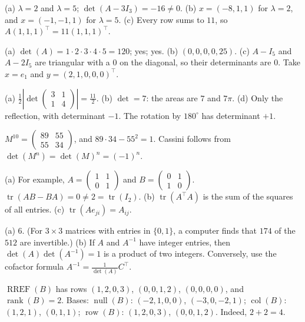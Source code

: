 \documentclass[11pt]{article}
\theoremstyle{definition}
\DeclareMathOperator{\rank}{rank}
\DeclareMathOperator{\Null}{null}
\DeclareMathOperator{\col}{col}
\DeclareMathOperator{\row}{row}
\DeclareMathOperator{\RREF}{RREF}
\DeclareMathOperator{\tr}{tr}
\begin{document}
\begin{description}[leftmargin=0pt, itemsep=0.3em]
    \item[\ref{pr:lambda}.] (a) $\lambda = 2$ and $\lambda = 5$; $\det(A - 3I_3) = -16 \neq 0$. (b) $x = (-8, 1, 1)$ for $\lambda = 2$, and $x = (-1, -1, 1)$ for $\lambda = 5$. (c) Every row sums to $11$, so $A(1, 1, 1)^\top = 11 (1, 1, 1)^\top$.
    \item[\ref{pr:upper5}.] (a) $\det(A) = 1 \cdot 2 \cdot 3 \cdot 4 \cdot 5 = 120$; yes; yes. (b) $(0, 0, 0, 0, 25)$. (c) $A - I_5$ and $A - 2I_5$ are triangular with a $0$ on the diagonal, so their determinants are $0$. Take $x = e_1$ and $y = (2, 1, 0, 0, 0)^\top$.
    \item[\ref{pr:area}.] (a) $\frac{1}{2}\left|\det \begin{pmatrix} 3 & 1 \\ 1 & 4 \end{pmatrix}\right| = \frac{11}{2}$. (b) $\det = 7$: the areas are $7$ and $7\pi$. (d) Only the reflection, with determinant $-1$. The rotation by $180^\circ$ has determinant $+1$.
    \item[\ref{pr:fibonacci}.] $M^{10} = \begin{pmatrix} 89 & 55 \\ 55 & 34 \end{pmatrix}$, and $89 \cdot 34 - 55^2 = 1$. Cassini follows from $\det(M^n) = \det(M)^n = (-1)^n$.
    \item[\ref{pr:trace}.] (a) For example, $A = \begin{pmatrix} 1 & 1 \\ 0 & 1 \end{pmatrix}$ and $B = \begin{pmatrix} 0 & 1 \\ 1 & 0 \end{pmatrix}$. $\tr(AB - BA) = 0 \neq 2 = \tr(I_2)$. (b) $\tr(A^\top A)$ is the sum of the squares of all entries. (c) $\tr(Ae_{ji}) = A_{ij}$.
    \item[\ref{pr:01-matrices}.] (a) $6$. (For $3 \times 3$ matrices with entries in $\{0, 1\}$, a computer finds that $174$ of the $512$ are invertible.) (b) If $A$ and $A^{-1}$ have integer entries, then $\det(A)\det(A^{-1}) = 1$ is a product of two integers. Conversely, use the cofactor formula $A^{-1} = \frac{1}{\det(A)} C^\top$.
    \item[\ref{pr:bases-B}.] $\RREF(B)$ has rows $(1, 2, 0, 3)$, $(0, 0, 1, 2)$, $(0, 0, 0, 0)$, and $\rank(B) = 2$. Bases: $\Null(B)$: $(-2, 1, 0, 0)$, $(-3, 0, -2, 1)$; $\col(B)$: $(1, 2, 1)$, $(0, 1, 1)$; $\row(B)$: $(1, 2, 0, 3)$, $(0, 0, 1, 2)$. Indeed, $2 + 2 = 4$.

\end{description}
\end{document}

